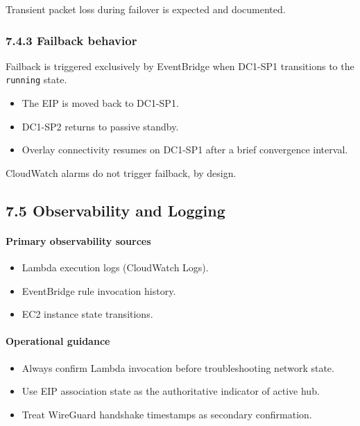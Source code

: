 \documentclass[11pt]{article}
\begin{document}
Transient packet loss during failover is expected and documented.

\subsubsection{7.4.3 Failback behavior}
\label{sec:failback-behavior}

Failback is triggered exclusively by EventBridge when DC1-SP1 transitions to the \texttt{running} state.

\begin{itemize}
  \item The EIP is moved back to DC1-SP1.
  \item DC1-SP2 returns to passive standby.
  \item Overlay connectivity resumes on DC1-SP1 after a brief convergence interval.
\end{itemize}

CloudWatch alarms do not trigger failback, by design.

%
%
\subsection{7.5 Observability and Logging}
\label{sec:observability-logging}

\paragraph{Primary observability sources}
\begin{itemize}
  \item Lambda execution logs (CloudWatch Logs).
  \item EventBridge rule invocation history.
  \item EC2 instance state transitions.
\end{itemize}

\paragraph{Operational guidance}
\begin{itemize}
  \item Always confirm Lambda invocation before troubleshooting network state.
  \item Use EIP association state as the authoritative indicator of active hub.
  \item Treat WireGuard handshake timestamps as secondary confirmation.
\end{itemize}
\end{document}
